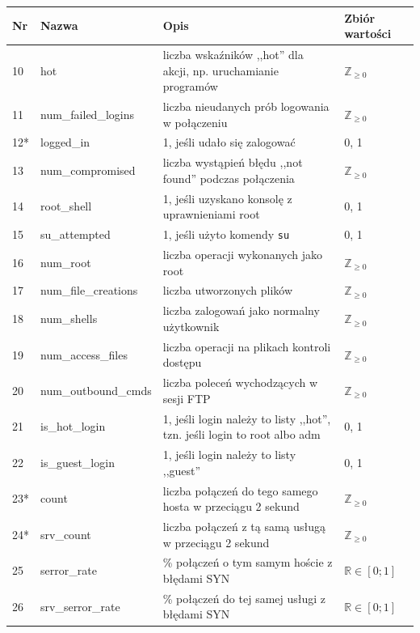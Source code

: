 \documentclass[a4paper, 12pt]{article}
\begin{document}
\begin{tabular}{ | l | l | p{6cm} | p{} | } \hline
Nr & Nazwa & Opis & Zbiór wartości \\ \hline
10      & hot & liczba wskaźników ,,hot'' dla akcji, np. uruchamianie programów & $\mathbb Z_{\ge 0}$ \\ \hline
11      & num\_failed\_logins  & liczba nieudanych prób logowania w połączeniu & $\mathbb Z_{\ge 0}$ \\ \hline
12*      & logged\_in  & 1, jeśli udało się zalogować &  0, 1 \\ \hline
13      & num\_compromised & liczba wystąpień błędu ,,not found'' podczas połączenia &  $\mathbb Z_{\ge 0}$ \\ \hline
14      & root\_shell  & 1, jeśli uzyskano konsolę z uprawnieniami root  &  0, 1 \\ \hline
15      & su\_attempted  & 1, jeśli użyto komendy \texttt{su} &  0, 1 \\ \hline
16      & num\_root  & liczba operacji wykonanych jako root  & $\mathbb Z_{\ge 0}$ \\ \hline
17      & num\_file\_creations  & liczba utworzonych plików  & $\mathbb Z_{\ge 0}$ \\ \hline
18      & num\_shells  & liczba zalogowań jako normalny użytkownik & $\mathbb Z_{\ge 0}$ \\ \hline
19      & num\_access\_files  & liczba operacji na plikach kontroli dostępu & $\mathbb Z_{\ge 0}$ \\ \hline
20      & num\_outbound\_cmds & liczba poleceń wychodzących w sesji FTP & $\mathbb Z_{\ge 0}$ \\ \hline
21      & is\_hot\_login  & 1, jeśli login należy to listy ,,hot'', tzn. jeśli login to root albo adm &  0, 1 \\ \hline
22      & is\_guest\_login  & 1, jeśli login należy to listy ,,guest'' &  0, 1 \\ \hline
23*     & count & liczba połączeń do tego samego hosta w przeciągu 2 sekund & $\mathbb Z_{\ge 0}$ \\ \hline
24*      & srv\_count   & liczba połączeń z tą samą usługą w przeciągu 2 sekund &  $\mathbb Z_{\ge 0}$ \\ \hline
25      & serror\_rate        & \% połączeń o tym samym hoście z błędami SYN  & $\mathbb{R} \in [0; 1]$ \\ \hline
26      & srv\_serror\_rate   & \% połączeń do tej samej usługi z błędami SYN & $\mathbb{R} \in [0; 1]$ \\ \hline

\end{tabular}
\end{document}
